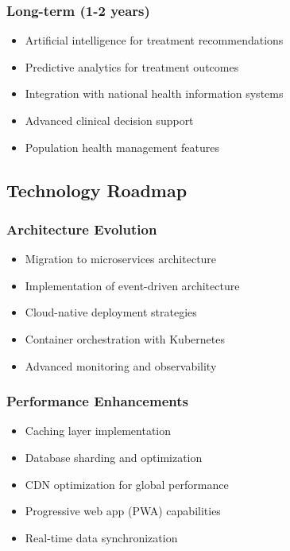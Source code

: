 \documentclass[12pt,a4paper]{article}
\begin{document}
\subsubsection{Long-term (1-2 years)}
\begin{itemize}
    \item Artificial intelligence for treatment recommendations
    \item Predictive analytics for treatment outcomes
    \item Integration with national health information systems
    \item Advanced clinical decision support
    \item Population health management features
\end{itemize}

\subsection{Technology Roadmap}

\subsubsection{Architecture Evolution}
\begin{itemize}
    \item Migration to microservices architecture
    \item Implementation of event-driven architecture
    \item Cloud-native deployment strategies
    \item Container orchestration with Kubernetes
    \item Advanced monitoring and observability
\end{itemize}

\subsubsection{Performance Enhancements}
\begin{itemize}
    \item Caching layer implementation
    \item Database sharding and optimization
    \item CDN optimization for global performance
    \item Progressive web app (PWA) capabilities
    \item Real-time data synchronization
\end{itemize}
\end{document}
